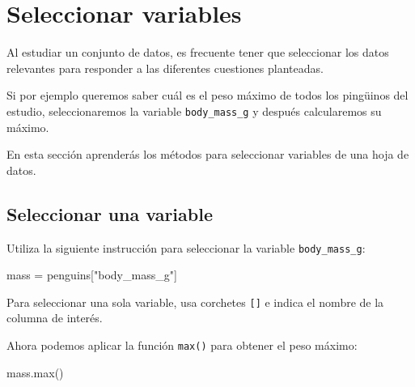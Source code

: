 \documentclass[
  a4paper,
  noprof,
  12pt,
  notoc,
  nosols,
  nobib]{mnye}
\newenvironment{Shaded}{\begin{snugshade}}{\end{snugshade}}
\newcommand{\BuiltInTok}[1]{\textcolor[rgb]{0.00,0.23,0.31}{#1}}
\newcommand{\NormalTok}[1]{\textcolor[rgb]{0.00,0.23,0.31}{#1}}
\newcommand{\OperatorTok}[1]{\textcolor[rgb]{0.37,0.37,0.37}{#1}}
\newcommand{\StringTok}[1]{\textcolor[rgb]{0.13,0.47,0.30}{#1}}
\theoremstyle{definition}
\theoremstyle{remark}
\begin{document}
\section{Seleccionar variables}\label{sec-subset-variables}

Al estudiar un conjunto de datos, es frecuente tener que seleccionar los
datos relevantes para responder a las diferentes cuestiones planteadas.

Si por ejemplo queremos saber cuál es el peso máximo de todos los
pingüinos del estudio, seleccionaremos la variable
\texttt{body\_mass\_g} y después calcularemos su máximo.

En esta sección aprenderás los métodos para seleccionar variables de una
hoja de datos.

\subsection{Seleccionar una variable}\label{sec-subset-one-variable}

Utiliza la siguiente instrucción para seleccionar la variable
\texttt{body\_mass\_g}:

\begin{Shaded}
\begin{Highlighting}[]
\NormalTok{mass }\OperatorTok{=}\NormalTok{ penguins[}\StringTok{"body\_mass\_g"}\NormalTok{]}
\end{Highlighting}
\end{Shaded}

\begin{tcolorbox}[enhanced jigsaw, colframe=quarto-callout-note-color-frame, rightrule=.15mm, breakable, left=2mm, bottomrule=.15mm, arc=.35mm, leftrule=.75mm, opacityback=0, toprule=.15mm, colback=white]
\begin{minipage}[t]{5.5mm}
\textcolor{quarto-callout-note-color}{\faInfo}
\end{minipage}%
\begin{minipage}[t]{\textwidth - 5.5mm}

Para seleccionar una sola variable, usa corchetes \texttt{{[}{]}} e
indica el nombre de la columna de interés.

\end{minipage}%
\end{tcolorbox}

Ahora podemos aplicar la función \texttt{max()} para obtener el peso
máximo:

\begin{Shaded}
\begin{Highlighting}[]
\NormalTok{mass.}\BuiltInTok{max}\NormalTok{()}
\end{Highlighting}
\end{Shaded}
\end{document}
